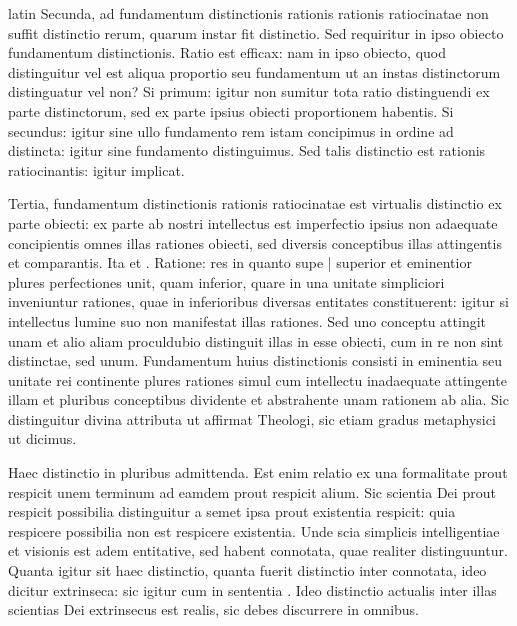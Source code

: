 \begin{otherlanguage*}{latin}
\pstart
 Secunda, ad fundamentum distinctionis rationis rationis ratiocinatae non suffit distinctio rerum, quarum instar fit distinctio. Sed requiritur in ipso obiecto fundamentum distinctionis. Ratio est efficax: nam in ipso obiecto, quod distinguitur vel est aliqua proportio seu fundamentum ut an instas distinctorum distinguatur vel non? Si primum: igitur non sumitur tota ratio distinguendi ex parte distinctorum, sed ex parte ipsius obiecti proportionem habentis. Si secundus: igitur sine ullo fundamento rem istam concipimus in ordine ad distincta: igitur sine fundamento distinguimus. Sed talis distinctio est rationis ratiocinantis: igitur implicat. 
\pend

\pstart
 Tertia, fundamentum distinctionis rationis ratiocinatae est virtualis distinctio ex parte obiecti: ex parte ab nostri intellectus est imperfectio ipsius non adaequate concipientis omnes illas rationes obiecti, sed diversis conceptibus illas attingentis et comparantis. Ita  et  . Ratione: res in quanto supe \textnormal{|}   superior et eminentior plures perfectiones unit, quam inferior, quare in una unitate simpliciori inveniuntur rationes, quae in inferioribus diversas entitates constituerent: igitur si intellectus lumine suo non manifestat illas rationes. Sed uno conceptu attingit unam et alio aliam proculdubio distinguit illas in esse obiecti, cum in re non sint distinctae, sed unum. Fundamentum huius distinctionis consisti in eminentia seu unitate rei continente plures rationes simul cum intellectu inadaequate attingente illam et pluribus conceptibus dividente et abstrahente unam rationem ab alia. Sic distinguitur divina attributa ut affirmat Theologi, sic etiam gradus metaphysici ut dicimus. 
\pend

        \pstart
        \pend
      
\pstart
 Haec distinctio in pluribus admittenda. Est enim relatio ex una formalitate prout respicit unem terminum ad eamdem prout respicit alium. Sic scientia Dei prout respicit possibilia distinguitur a semet ipsa prout existentia respicit: quia respicere possibilia non est respicere existentia. Unde scia simplicis intelligentiae et visionis est adem entitative, sed habent connotata, quae realiter distinguuntur. Quanta igitur sit haec distinctio, quanta fuerit distinctio inter connotata, ideo dicitur extrinseca: sic igitur cum in sententia . Ideo distinctio actualis inter illas scientias Dei extrinsecus est realis, sic debes discurrere in omnibus. 
\pend


\end{otherlanguage*}
